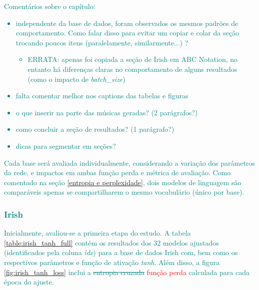 \documentclass{automatextcc}
\newcommand{\nico}[1]{\textcolor{teal}{#1}}
\newcommand{\pumi}[1]{\textcolor{red}{#1}}
\begin{document}
\nico{
Comentários sobre o capítulo:
\begin{itemize}
    \item independente da base de dados, foram observados os mesmos padrões de comportamento. Como falar disso para evitar um copiar e colar da seção trocando poucos itens (paralelamente, similarmente...) ?
    \begin{itemize}
        \item ERRATA: apenas foi copiada a seção de Irish em ABC Notation, no entanto há diferenças claras no comportamento de alguns resultados (como o impacto de \textit{batch\_size})
    \end{itemize}
    \item falta comentar melhor nos captions das tabelas e figuras
    \item o que inserir na parte das músicas geradas? (2 parágrafos?)
    \item como concluir a seção de resultados? (1 parágrafo?)
    \item dicas para segmentar em seções?
\end{itemize}
}

\nico{ %
Cada base será avaliada individualmente, considerando a variação dos parâmetros da rede, e impactos em ambas função perda e métrica de avaliação. Como comentado na seção \ref{entropia e perplexidade}, dois modelos de linguagem são comparáveis apenas se compartilharem o mesmo vocabulário (único por base). 
}


\subsubsection{\nico{Irish}}



\nico{
Inicialmente, avaliou-se a primeira etapa do estudo. A tabela \ref{table:irish_tanh_full} contém os resultados dos 32 modelos ajustados (identificados pela coluna \textit{idx}) para a base de dados Irish com, bem como os respectivos parâmetros e função de ativação \textit{tanh}. Além disso, a figura \ref{fig:irish_tanh_loss} inclui a \sout{entropia cruzada} \pumi{função perda} calculada para cada época do ajuste. 
}
\end{document}
